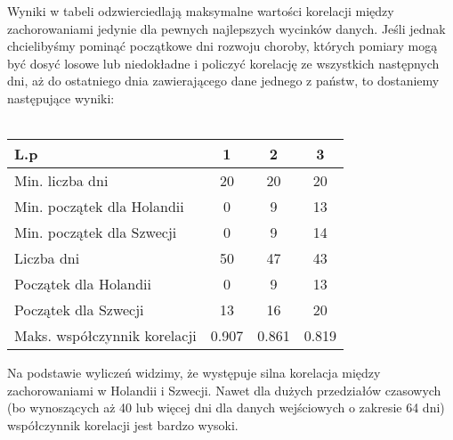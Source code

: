 \documentclass[a4paper,12pt] {article}
\begin{document}
Wyniki w tabeli odzwierciedlają maksymalne wartości korelacji między zachorowaniami jedynie dla pewnych najlepszych wycinków danych. Jeśli jednak chcielibyśmy pominąć początkowe dni rozwoju choroby, których pomiary mogą być dosyć losowe lub niedokładne i policzyć korelację ze wszystkich następnych dni, aż do ostatniego dnia zawierającego dane jednego z państw, to dostaniemy następujące wyniki:\\\\
\begin{tabular}{| l | c | c | c |}
\hline
L.p & 1 & 2 & 3 \\ 
\hline
Min. liczba dni & 20 & 20 & 20\\
\hline
Min. początek dla Holandii & 0 & 9 & 13 \\
\hline
Min. początek dla Szwecji & 0 & 9 & 14 \\
\hline
Liczba dni & 50 & 47 & 43\\
\hline
Początek dla Holandii & 0 & 9 & 13 \\
\hline
Początek dla Szwecji & 13 & 16 & 20\\
\hline
Maks. współczynnik korelacji & 0.907 & 0.861 & 0.819\\
\hline
\end{tabular}
\pagebreak

Na podstawie wyliczeń widzimy, że występuje silna korelacja między zachorowaniami w Holandii i Szwecji. Nawet dla dużych przedziałów czasowych (bo wynoszących aż 40 lub więcej dni dla danych wejściowych o zakresie 64 dni) współczynnik korelacji jest bardzo wysoki.
\end{document}
